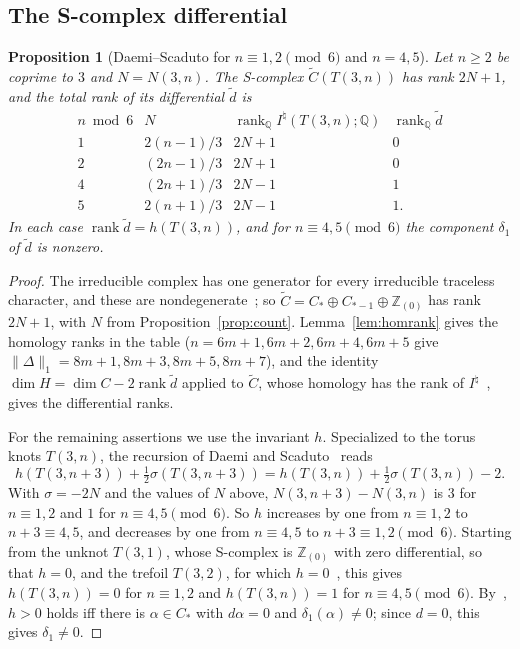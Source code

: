 \documentclass[11pt,reqno]{amsart}
\theoremstyle{plain}
\newtheorem{proposition}[theorem]{Proposition}
\theoremstyle{definition}
\newcommand{\Z}{\mathbb{Z}}
\newcommand{\Inat}{I^{\natural}}
\newcommand{\td}{\widetilde d}
\begin{document}
\subsection{The S-complex differential}\label{sec:grading-diff}

\begin{proposition}[Daemi--Scaduto for $n\equiv1,2\pmod6$ and $n=4,5$]\label{prop:even}
Let $n\ge2$ be coprime to $3$ and $N=N(3,n)$. The S-complex $\widetilde C(T(3,n))$ has rank $2N+1$, and
the total rank of its differential $\td$ is
\[
\begin{array}{c|c|c|c}
n\bmod 6 & N & \operatorname{rank}_{\mathbb Q}\Inat(T(3,n);\mathbb Q) &
\operatorname{rank}_{\mathbb Q}\td\\ \hline
1 & 2(n-1)/3 & 2N+1 & 0\\
2 & (2n-1)/3 & 2N+1 & 0\\
4 & (2n+1)/3 & 2N-1 & 1\\
5 & 2(n+1)/3 & 2N-1 & 1.
\end{array}
\]
In each case $\operatorname{rank}\td=h(T(3,n))$, and for $n\equiv4,5\pmod6$ the component $\delta_1$ of
$\td$ is nonzero.
\end{proposition}

\begin{proof}
The irreducible complex has one generator for every irreducible traceless character, and these are
nondegenerate~\cite[\S9.5]{DSEquiv}; so $\widetilde C=C_*\oplus C_{*-1}\oplus\Z_{(0)}$ has rank $2N+1$,
with $N$ from Proposition~\ref{prop:count}. Lemma~\ref{lem:homrank} gives the homology ranks in the table
($n=6m+1,6m+2,6m+4,6m+5$ give $\|\Delta\|_1=8m+1,8m+3,8m+5,8m+7$), and the identity $\dim H=\dim
C-2\operatorname{rank}\td$ applied to $\widetilde C$, whose homology has the rank of
$\Inat$~\cite[Thm.~8.9]{DSEquiv}, gives the differential ranks.

For the remaining assertions we use the invariant $h$. Specialized to the torus knots $T(3,n)$, the recursion of
Daemi and Scaduto~\cite[Prop.~6.11]{DScaduto} reads
\[
h(T(3,n+3))+\tfrac12\sigma(T(3,n+3))=h(T(3,n))+\tfrac12\sigma(T(3,n))-2.
\]
With $\sigma=-2N$ and the values of $N$ above, $N(3,n+3)-N(3,n)$ is $3$ for $n\equiv1,2$ and $1$ for
$n\equiv4,5\pmod6$. So $h$ increases by one from $n\equiv1,2$ to $n+3\equiv4,5$, and decreases by one from
$n\equiv4,5$ to $n+3\equiv1,2\pmod6$. Starting from the unknot $T(3,1)$, whose S-complex is $\Z_{(0)}$ with zero differential, so that $h=0$, and the
trefoil $T(3,2)$, for which $h=0$~\cite[Thm.~1.14(i)]{DSEquiv}, this gives $h(T(3,n))=0$ for $n\equiv1,2$
and $h(T(3,n))=1$ for $n\equiv4,5\pmod6$. By~\cite[Prop.~4.15]{DSEquiv}, $h>0$ holds iff there is
$\alpha\in C_*$ with $d\alpha=0$ and $\delta_1(\alpha)\neq0$; since $d=0$, this gives $\delta_1\neq0$.
\end{proof}
\end{document}
